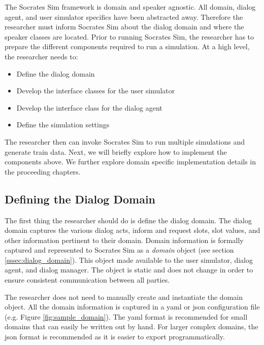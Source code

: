 The Socrates Sim framework is domain and speaker agnostic. All domain, dialog agent, and user simulator specifics have been abstracted away. Therefore the researcher must inform Socrates Sim about the dialog domain and where the speaker classes are located. Prior to running Socrates Sim, the researcher has to prepare the different components required to run a simulation. At a high level, the researcher needs to: 
\begin{itemize}
	\item Define the dialog domain 
	\item Develop the interface classes for the user simulator
	\item Develop the interface class for the dialog agent
	\item Define the simulation settings
\end{itemize}

The researcher then can invoke Socrates Sim to run multiple simulations and generate train data. Next, we will briefly explore how to implement the components above. We further explore domain specific implementation details in the proceeding chapters. 

\subsection{Defining the Dialog Domain}

The first thing the researcher should do is define the dialog domain. The dialog domain captures the various dialog acts, inform and request slots, slot values, and other information pertinent to their domain. Domain information is formally captured and represented to Socrates Sim as a \textit{domain} object (see section \ref{sssec:dialog_domain}). This object made available to the user simulator, dialog agent, and dialog manager. The object is static and does not change in order to ensure consistent communication between all parties. 

The researcher does not need to manually create and instantiate the domain object. All the domain information is captured in a yaml or json configuration file (e.g. Figure \ref{fig:sample_domain}). The yaml format is recommended for small domains that can easily be written out by hand. For larger complex domains, the json format is recommended as it is easier to export programmatically. 

